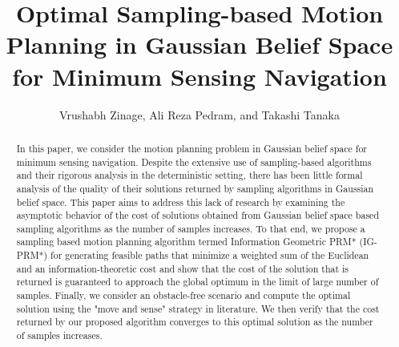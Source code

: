 \documentclass[Afour,sageh,times]{sagej}
\begin{document}
\title{Optimal Sampling-based Motion Planning in Gaussian Belief Space for Minimum Sensing Navigation}

\author{Vrushabh Zinage, Ali Reza Pedram, and Takashi Tanaka}
% 



\begin{abstract}
In this paper, we consider the motion planning problem in Gaussian belief space for minimum sensing navigation. Despite the extensive use of sampling-based algorithms and their rigorous analysis in the deterministic setting, there has been little formal analysis of the quality of their solutions returned by sampling algorithms in Gaussian belief space. This paper aims to address this lack of research by examining the asymptotic behavior of the cost of solutions obtained from Gaussian belief space based sampling algorithms as the number of samples increases. To that end, we propose a sampling based motion planning algorithm termed Information Geometric PRM* (IG-PRM*) for generating feasible paths that minimize a weighted sum of the Euclidean and an information-theoretic cost and show that the cost of the solution that is returned is guaranteed to approach the global optimum in the limit of large number of samples. Finally, we consider an obstacle-free scenario and compute the optimal solution using the "move and sense" strategy in literature. We then verify that the cost returned by our proposed algorithm converges to this optimal solution as the number of samples increases.
\end{abstract}


\maketitle
\end{document}
